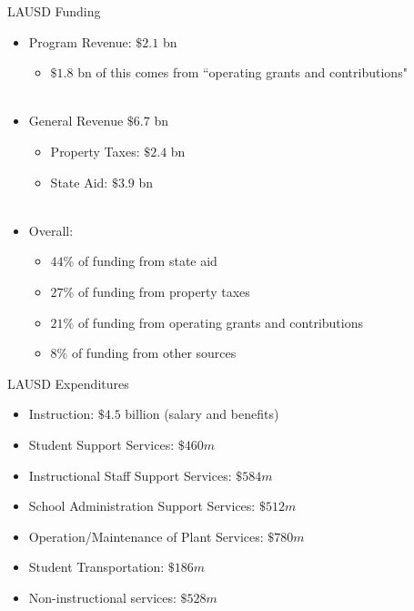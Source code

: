 \documentclass{beamer}
\begin{document}
\begin{frame}{LAUSD Funding}
\begin{itemize}
\item Program Revenue: $\$2.1$ bn
	\begin{itemize}
	\item $\$1.8$ bn of this comes from ``operating grants and contributions" \\~\\
	\end{itemize}
\item General Revenue $\$6.7$ bn
	\begin{itemize}
	\item Property Taxes: $\$2.4$ bn
	\item State Aid: $\$3.9$ bn \\~\\
	\end{itemize}
\item Overall:
	\begin{itemize}
	\item $44\%$ of funding from state aid
	\item $27\%$ of funding from property taxes
	\item $21\%$ of funding from operating grants and contributions
	\item $8\%$ of funding from other sources
	\end{itemize}
\end{itemize}
\end{frame}

\begin{frame}{LAUSD Expenditures}
\begin{itemize}
\item Instruction: $\$4.5$ billion (salary and benefits)
\item Student Support Services: $\$460m$
\item Instructional Staff Support Services: $\$584m$
\item School Administration Support Services: $\$512m$
\item Operation/Maintenance of Plant Services: $\$780m$
\item Student Transportation: $\$186m$
\item Non-instructional services: $\$528m$
\end{itemize}
\end{frame}
\end{document}
